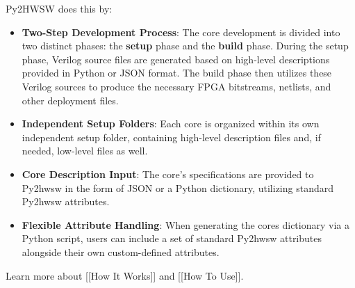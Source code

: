 %

Py2HWSW does this by:
\begin{itemize}
\item \textbf{Two-Step Development Process}: The core development is divided
into two distinct phases: the \textbf{setup} phase and the \textbf{build}
phase. During the setup phase, Verilog source files are generated based on
high-level descriptions provided in Python or JSON format. The build phase then
utilizes these Verilog sources to produce the necessary FPGA bitstreams,
netlists, and other deployment files.

\item \textbf{Independent Setup Folders}: Each core is organized within its own
independent setup folder, containing high-level description files and, if
needed, low-level files as well.

\item \textbf{Core Description Input}: The core's specifications are provided
to Py2hwsw in the form of JSON or a Python dictionary, utilizing standard
Py2hwsw attributes.

\item \textbf{Flexible Attribute Handling}: When generating the cores
dictionary via a Python script, users can include a set of standard Py2hwsw
attributes alongside their own custom-defined attributes.
\end{itemize}

Learn more about [[How It Works]] and [[How To Use]].
